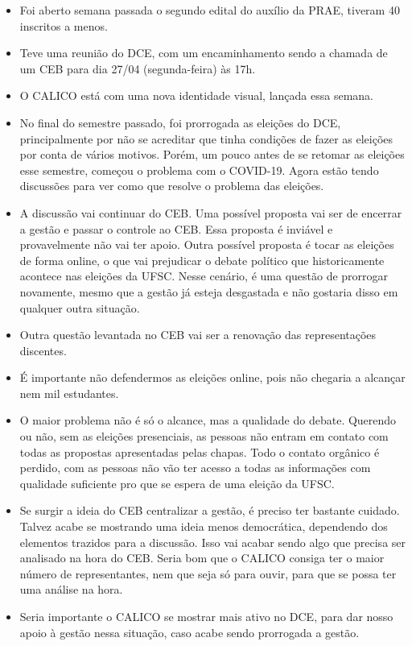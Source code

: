 \documentclass{ata-calico}
\begin{document}
\maketitle

\begin{itemize}
\item Foi aberto semana passada o segundo edital do auxílio da PRAE, tiveram 40 inscritos a menos.
\item Teve uma reunião do DCE, com um encaminhamento sendo a chamada de um CEB para dia 27/04 (segunda-feira) às 17h.
\item O CALICO está com uma nova identidade visual, lançada essa semana.
\end{itemize}

\begin{itemize}
\item No final do semestre passado, foi prorrogada as eleições do DCE, principalmente por não se acreditar que tinha condições de fazer as eleições por conta de vários motivos. Porém, um pouco antes de se retomar as eleições esse semestre, começou o problema com o COVID-19. Agora estão tendo discussões para ver como que resolve o problema das eleições.
\item A discussão vai continuar do CEB. Uma possível proposta vai ser de encerrar a gestão e passar o controle ao CEB. Essa proposta é inviável e provavelmente não vai ter apoio. Outra possível proposta é tocar as eleições de forma online, o que vai prejudicar o debate político que historicamente acontece nas eleições da UFSC. Nesse cenário, é uma questão de prorrogar novamente, mesmo que a gestão já esteja desgastada e não gostaria disso em qualquer outra situação.
\item Outra questão levantada no CEB vai ser a renovação das representações discentes.
\item É importante não defendermos as eleições online, pois não chegaria a alcançar nem mil estudantes.
\item O maior problema não é só o alcance, mas a qualidade do debate. Querendo ou não, sem as eleições presenciais, as pessoas não entram em contato com todas as propostas apresentadas pelas chapas. Todo o contato orgânico é perdido, com as pessoas não vão ter acesso a todas as informações com qualidade suficiente pro que se espera de uma eleição da UFSC.
\item Se surgir a ideia do CEB centralizar a gestão, é preciso ter bastante cuidado. Talvez acabe se mostrando uma ideia menos democrática, dependendo dos elementos trazidos para a discussão. Isso vai acabar sendo algo que precisa ser analisado na hora do CEB. Seria bom que o CALICO consiga ter o maior número de representantes, nem que seja só para ouvir, para que se possa ter uma análise na hora.
\item Seria importante o CALICO se mostrar mais ativo no DCE, para dar nosso apoio à gestão nessa situação, caso acabe sendo prorrogada a gestão.
\end{itemize}
\end{document}
